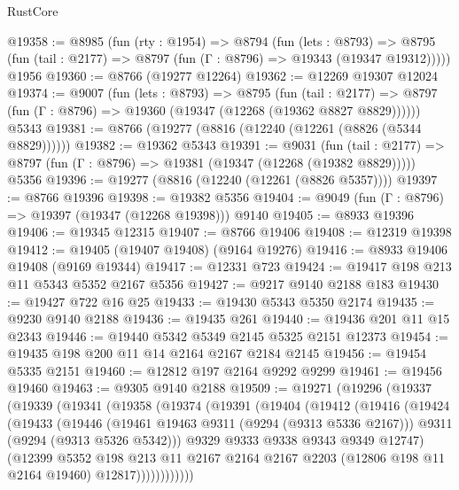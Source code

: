 \begin{lexlean}{RustCore}
\begin{coremodule}
@19358 := @8985
    (fun (rty : @1954) =>
    @8794
      (fun (lets : @8793) =>
      @8795 (fun (tail : @2177) => @8797 (fun (Γ : @8796) => @19343 (@19347 @19312)))))
    @1956
@19360 := @8766 (@19277 @12264)
@19362 := @12269 @19307 @12024
@19374 := @9007
    (fun (lets : @8793) =>
    @8795
      (fun (tail : @2177) =>
      @8797 (fun (Γ : @8796) => @19360 (@19347 (@12268 (@19362 @8827 @8829))))))
    @5343
@19381 := @8766 (@19277 (@8816 (@12240 (@12261 (@8826 (@5344 @8829))))))
@19382 := @19362 @5343
@19391 := @9031
    (fun (tail : @2177) => @8797 (fun (Γ : @8796) => @19381 (@19347 (@12268 (@19382 @8829)))))
    @5356
@19396 := @19277 (@8816 (@12240 (@12261 (@8826 @5357))))
@19397 := @8766 @19396
@19398 := @19382 @5356
@19404 := @9049 (fun (Γ : @8796) => @19397 (@19347 (@12268 @19398))) @9140
@19405 := @8933 @19396
@19406 := @19345 @12315
@19407 := @8766 @19406
@19408 := @12319 @19398
@19412 := @19405 (@19407 @19408) (@9164 @19276)
@19416 := @8933 @19406 @19408 (@9169 @19344)
@19417 := @12331 @723
@19424 := @19417 @198 @213 @11 @5343 @5352 @2167 @5356
@19427 := @9217 @9140 @2188 @183
@19430 := @19427 @722 @16 @25
@19433 := @19430 @5343 @5350 @2174
@19435 := @9230 @9140 @2188
@19436 := @19435 @261
@19440 := @19436 @201 @11 @15 @2343
@19446 := @19440 @5342 @5349 @2145 @5325 @2151 @12373
@19454 := @19435 @198 @200 @11 @14 @2164 @2167 @2184 @2145
@19456 := @19454 @5335 @2151
@19460 := @12812 @197 @2164 @9292 @9299
@19461 := @19456 @19460
@19463 := @9305 @9140 @2188
@19509 := @19271
    (@19296
      (@19337
        (@19339
          (@19341
            (@19358
              (@19374
                (@19391
                  (@19404
                    (@19412
                      (@19416
                        (@19424
                          (@19433
                            (@19446
                              (@19461 @19463 @9311 (@9294 (@9313 @5336 @2167)))
                              @9311
                              (@9294 (@9313 @5326 @5342)))
                            @9329
                            @9333
                            @9338
                            @9343
                            @9349
                            @12747)
                          (@12399
                            @5352
                            @198
                            @213
                            @11
                            @2167
                            @2164
                            @2167
                            @2203
                            (@12806 @198 @11 @2164 @19460)
                            @12817))))))))))))

\end{coremodule}
\end{lexlean}
